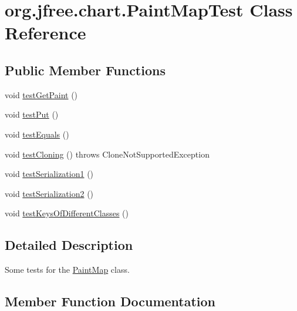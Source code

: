 \hypertarget{classorg_1_1jfree_1_1chart_1_1_paint_map_test}{}\section{org.\+jfree.\+chart.\+Paint\+Map\+Test Class Reference}
\label{classorg_1_1jfree_1_1chart_1_1_paint_map_test}
\subsection*{Public Member Functions}
\begin{DoxyCompactItemize}
\item 
void \mbox{\hyperlink{classorg_1_1jfree_1_1chart_1_1_paint_map_test_a7494fd58f184c31616a3a1414b8f284f}{test\+Get\+Paint}} ()
\item 
void \mbox{\hyperlink{classorg_1_1jfree_1_1chart_1_1_paint_map_test_af111df58307a9accc3fd627f9132fa97}{test\+Put}} ()
\item 
void \mbox{\hyperlink{classorg_1_1jfree_1_1chart_1_1_paint_map_test_aaebd421c6ae32cb8b6ea01dacbe1fdcb}{test\+Equals}} ()
\item 
void \mbox{\hyperlink{classorg_1_1jfree_1_1chart_1_1_paint_map_test_af21dc61a302a397423f3c339e26efb86}{test\+Cloning}} ()  throws Clone\+Not\+Supported\+Exception 
\item 
void \mbox{\hyperlink{classorg_1_1jfree_1_1chart_1_1_paint_map_test_a6dfab1bc3317cfed284e066c57ff9a9f}{test\+Serialization1}} ()
\item 
void \mbox{\hyperlink{classorg_1_1jfree_1_1chart_1_1_paint_map_test_a9b38e247cc8116a944dc65db277eb197}{test\+Serialization2}} ()
\item 
void \mbox{\hyperlink{classorg_1_1jfree_1_1chart_1_1_paint_map_test_aadc8c5620176164a33eed14eb0f0bba3}{test\+Keys\+Of\+Different\+Classes}} ()
\end{DoxyCompactItemize}


\subsection{Detailed Description}
Some tests for the \mbox{\hyperlink{classorg_1_1jfree_1_1chart_1_1_paint_map}{Paint\+Map}} class. 

\subsection{Member Function Documentation}
\mbox{\label{classorg_1_1jfree_1_1chart_1_1_paint_map_test_af21dc61a302a397423f3c339e26efb86}} 
